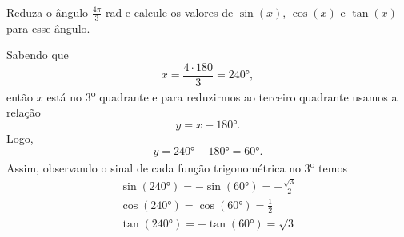 \begin{example}
  Reduza o ângulo
  \(\frac{4\pi}{3}\) rad
  e calcule os valores de
  $\sin(x)$, $\cos(x)$ e $\tan(x)$ para esse ângulo.

  \solution
  Sabendo que
  \[
    x
    = \frac{4 \cdot 180}{3}
    = \ang{240},
  \]
  então $x$ está no 3\textsuperscript{o}
  quadrante e para reduzirmos ao terceiro quadrante usamos a relação
  \[
    y = x-\ang{180}.
  \]
  Logo,
  \[
    y
    = \ang{240} - \ang{180}
    = \ang{60}.
  \]
  Assim, observando o sinal de cada função trigonométrica no
  3\textsuperscript{o} temos
  \begin{gather*}
    \sin(\ang{240}) = -\sin(\ang{60}) = -\frac{\sqrt{3}}{2} \\[2mm]
    \cos(\ang{240}) =  \cos(\ang{60}) =  \frac{1}{2}        \\[2mm]
    \tan(\ang{240}) = -\tan(\ang{60}) =  \sqrt{3}
  \end{gather*}
\end{example}

